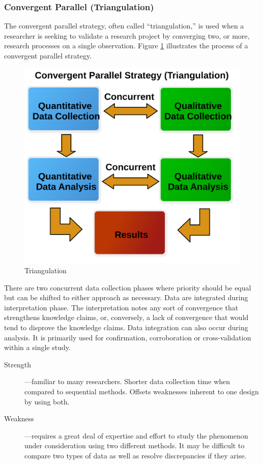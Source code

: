 \subsubsection{Convergent Parallel (Triangulation)}

The convergent parallel strategy, often called ``triangulation,'' is used when a researcher is seeking to validate a research project by converging two, or more, research processes on a single observation. Figure \ref{14:fig92} illustrates the process of a convergent parallel strategy. 

\begin{figure}[H]
	\centering
	\includegraphics[width=\maxwidth{.95\linewidth}]{gfx/14-Triangulation}
	\caption{Triangulation}
	\label{14:fig92}
\end{figure}

There are two concurrent data collection phases where priority should be equal but can be shifted to either approach as necessary. Data are integrated during interpretation phase. The interpretation notes any sort of convergence that strengthens knowledge claims, or, conversely, a lack of convergence that would tend to disprove the knowledge claims. Data integration can also occur during analysis. It is primarily used for confirmation, corroboration or cross-validation within a single study.

\begin{description}
	\item[Strength]---familiar to many researchers. Shorter data collection time when compared to sequential methods. Offsets weaknesses inherent to one design by using both.
	\item[Weakness]---requires a great deal of expertise and effort to study the phenomenon under consideration using two different methods. It may be difficult to compare two types of data as well as resolve discrepancies if they arise.
\end{description}

